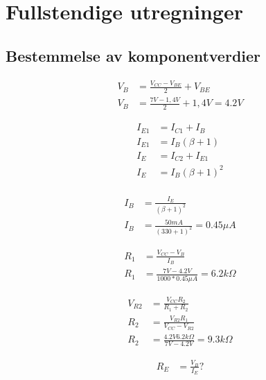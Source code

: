 
\appendix
\section{Fullstendige utregninger}\label{ax:math}

\subsection{Bestemmelse av komponentverdier}

\begin{equation}
    \label{eq:arbeidspunkt}
    \begin{split}
    V_B &= \frac{V_{CC} - V_{BE}}{2} + V_{BE}\\
    V_B &= \frac{7V - 1,4V}{2} + 1,4V = 4.2V
    \end{split}
    \end{equation}
    
    \begin{equation}
    \label{eq:IE}
    \begin{split}
    I_{E1} &= I_{C1} + I_{B}\\
    I_{E1} &= I_{B}(\beta + 1)\\
    I_{E} &= I_{C2} + I_{E1}\\
    I_{E} &= I_{B}(\beta + 1)^2 \\
    \end{split}
    \end{equation}
    
    \begin{equation}
    \label{eq:IB}
    \begin{split}
    I_{B} &= \frac{I_{E}}{(\beta + 1)^2} \\
    I_{B} &= \frac{50mA}{(330 + 1)^2} = 0.45\mu A
    \end{split}
    \end{equation}
    
    \begin{equation}
    \label{eq:R1}
    \begin{split}
    R_{1} &= \frac{V_{CC} - V_{B}}{I_{B}}\\
    R_{1} &= \frac{7V - 4.2V}{1000*0.45\mu A} = 6.2k\Omega
    \end{split}
    \end{equation}
    
    \begin{equation}
    \label{eq:R2}
    \begin{split}
    V_{R2} &= \frac{V_{CC} R_2}{R_1 + R_2}\\
    R_2 &= \frac{V_{R2} R_1}{V_{CC}-V_{R2}}\\
    R_2 &= \frac{4.2V 6.2k\Omega}{7V-4.2V} = 9.3k\Omega
    \end{split}
    \end{equation}
    
    \begin{equation}
    \label{eq:RE}
    \begin{split}
    R_{E} &= \frac{V_{B}}{I_{E}}?\\ 
    \end{split}
    \end{equation}
    
    